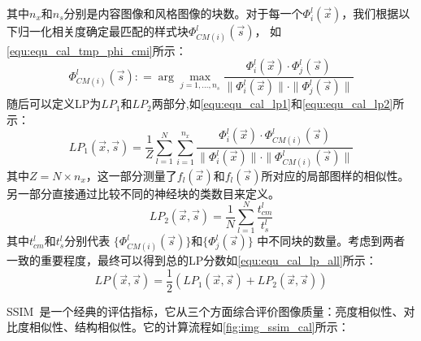 其中$n_x$和$n_s$分别是内容图像和风格图像的块数。对于每一个\(\Phi_i^l(\vec{x})\)，我们根据以下归一化相关度确定最匹配的样式块\(\Phi_{CM(i)}^l(\vec{s})\)，
如\autoref{equ:equ_cal_tmp_phi_cmi}所示：
\begin{equation}
    \label{equ:equ_cal_tmp_phi_cmi}
    \Phi_{CM(i)}^l(\vec{s}){:}=\arg\max_{j=1,...,n_s}\frac{\Phi_i^l(\vec{x})\cdot\Phi_j^l(\vec{s})}{\parallel\Phi_i^l(\vec{x})\parallel\cdot\parallel\Phi_j^l(\vec{s})\parallel}
\end{equation}
随后可以定义LP为$LP_1$和$LP_2$两部分,如\autoref{equ:equ_cal_lp1}和\autoref{equ:equ_cal_lp2}所示：
\begin{equation}
    \label{equ:equ_cal_lp1}
    LP_1(\vec{x},\vec{s})=\frac1Z\sum_{l=1}^N\sum_{i=1}^{n_x}\frac{\Phi_i^l(\vec{x})\cdot\Phi_{CM(i)}^l(\vec{s})}{\parallel\Phi_i^l(\vec{x})\parallel\cdot\parallel\Phi_{CM(i)}^l(\vec{s})\parallel}
\end{equation}
其中\(Z=N\times n_x\)，这一部分测量了\(f_l(\vec{x})\)和\(f_l(\vec{s})\)所对应的局部图样的相似性。
另一部分直接通过比较不同的神经块的类数目来定义。
\begin{equation}
    \label{equ:equ_cal_lp2}
    LP_2(\vec{x},\vec{s})=\frac1N\sum_{l=1}^N\frac{t_{cm}^l}{t_s^l}
\end{equation}
其中$t_{cm}^{l}$和$t_{s}^{l}$分别代表
$\{\Phi_{CM(i)}^l(\vec{s})\}$和$\{\Phi_j^l(\vec{s})\}$
中不同块的数量。考虑到两者一致的重要程度，最终可以得到总的LP分数如\autoref{equ:equ_cal_lp_all}所示：
\begin{equation}
    \label{equ:equ_cal_lp_all}
    LP(\vec{x},\vec{s})=\frac12(LP_1(\vec{x},\vec{s})+LP_2(\vec{x},\vec{s}))
\end{equation}
\par SSIM~\cite{wang2004image}是一个经典的评估指标，它从三个方面综合评价图像质量：亮度相似性、对比度相似性、结构相似性。它的计算流程如\autoref{fig:img_ssim_cal}所示：

